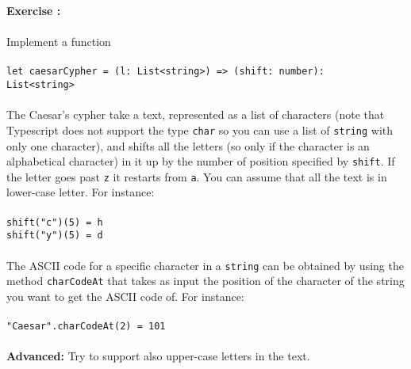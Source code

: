 \documentclass[]{article}
\newcounter{ExerciseCount}
\newcommand{\functionEx}[3]{
  Implement a function\\\\
   \texttt{let #1 = #2}\\\\ #3
}
\newcommand{\exercise}[1]{\noindent \textbf{Exercise \theExerciseCount:}\\\\ #1 \addtocounter{ExerciseCount}{1}
}
\begin{document}
\exercise{
  \functionEx{caesarCypher}{(l: List<string>) => (shift: number):\\ List<string>}{
    The Caesar's cypher take a text, represented as a list of characters (note that Typescript does not support the type \texttt{char} so you can use a list of \texttt{string} with only one character), and shifts all the letters (so only if the character is an alphabetical character) in it up by the number of position specified by \texttt{shift}. If the letter goes past \texttt{z} it restarts from \texttt{a}. You can assume that all the text is in lower-case letter. For instance:\\\\    
    \texttt{shift("c")(5) = h}\\
    \texttt{shift("y")(5) = d}\\\\
    The ASCII code for a specific character in a \texttt{string} can be obtained by using the method \texttt{charCodeAt} that takes as input the position of the character of the string you want to get the ASCII code of. For instance:\\\\
    \texttt{"Caesar".charCodeAt(2) = 101}\\\\
    \textbf{Advanced: } Try to support also upper-case letters in the text.
  }
}\\
\end{document}
